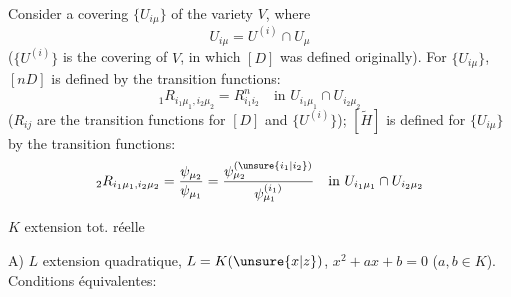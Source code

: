 Consider a covering $\{U_{i\mu}\}$ of the variety $V$, where
\[
U_{i\mu}=U^{(i)}\cap U_\mu
\]
($\{U^{(i)}\}$ is the covering of $V$, in which $[D]$ was defined originally). For $\{U_{i\mu}\}$, $[nD]$ is defined by the transition functions:
\[
{}_1R_{i_1\mu_1,i_2\mu_2}=R^n_{i_1i_2}\quad\text{in }U_{i_1\mu_1}\cap U_{i_2\mu_2}
\]
($R_{ij}$ are the transition functions for $[D]$ and $\{U^{(i)}\}$); $[\widetilde H]$ is defined for $\{U_{i\mu}\}$ by the transition functions:
\[
{}_2R_{i_1\mu_1,i_2\mu_2}=\frac{\psi_{\mu_2}}{\psi_{\mu_1}}=\frac{\psi^{(\unsure{i_1|i_2})}_{\mu_2}}{\psi^{(i_1)}_{\mu_1}}\quad\text{in }U_{i_1\mu_1}\cap U_{i_2\mu_2}
\]



$K$ extension tot. réelle \margin{[i.e. si $K$ défini par $H\subset\pi_1(Q)$, $H$ ne contient aucun conjugué de $\tau$, $\tau$ la conjugaison ordinaire)}

A) $L$ extension quadratique, $L=K(\unsure{x|z})$, $x^2+ax+b=0$ ($a,b\in K$).
Conditions équivalentes:

